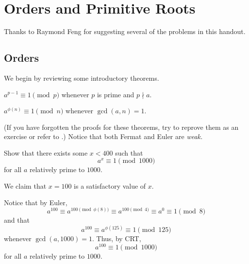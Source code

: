 \documentclass[blue,onecol]{shooting}
\begin{document}

\chapter{Orders and Primitive Roots}











Thanks to Raymond Feng for suggesting several of the problems in this handout.

\section{Orders}
We begin by reviewing some introductory theorems. 

\begin{theo}[Fermat]
$a^{p-1} \equiv 1 \pmod{p}$ whenever $p$ is prime and $p \nmid a.$
\end{theo}

\begin{theo}[Euler]
$a^{\phi(n)} \equiv 1 \pmod{n}$ whenever $\gcd(a, n) = 1.$
\end{theo}

(If you have forgotten the proofs for these theorems, try to reprove them as an exercise or refer to .) Notice that both Fermat and Euler are \emph{weak.}

\begin{exam}
Show that there exists some $x < 400$ such that $$a^x \equiv 1 \pmod{1000}$$ for all $a$ relatively prime to $1000.$
\end{exam}

\begin{sol}
We claim that $x=100$ is a satisfactory value of $x.$

Notice that by Euler, $$a^{100} \equiv a^{100 \pmod{\phi(8)}} \equiv a^{100 \pmod{4}} \equiv a^0 \equiv 1 \pmod{8}$$ and that $$a^{100} \equiv a^{\phi (125)} \equiv 1 \pmod{125}$$ whenever $\gcd(a, 1000) = 1.$ Thus, by CRT, $$a^{100} \equiv 1 \pmod{1000}$$ for all $a$ relatively prime to $1000.$
\end{sol}
\end{document}
